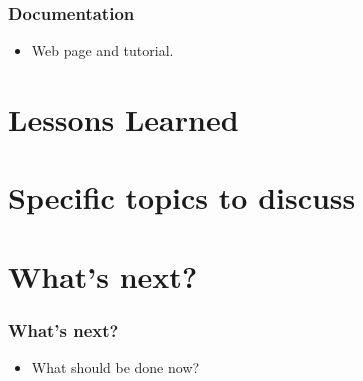 \documentclass{beamer}
\begin{document}
\begin{frame}
  \frametitle{Documentation}
  \begin{itemize}
  \item Web page and tutorial.
  \end{itemize}
  
\end{frame}

\section{Lessons Learned}

\section{Specific topics to discuss}

\section{What's next?}

\begin{frame}
  \frametitle{What's next?}
 \begin{itemize}
 \item What should be done now?
 \end{itemize}
\end{frame}
\end{document}
